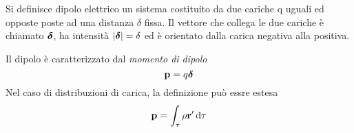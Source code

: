 \begin{defn}
    Si definisce dipolo elettrico un sistema costituito da due cariche q uguali ed opposte poste
    ad una distanza $\delta$ fissa. Il vettore che collega le due cariche è chiamato $\vb*{\delta}$,
    ha intensità $\abs{\vb*{\delta}}=\delta$ ed è orientato dalla carica negativa alla positiva.
\end{defn}

Il dipolo è caratterizzato dal \textit{momento di dipolo}
\begin{equation}
    \label{eqn:momento_di_dipolo}
    \vb{p}=q\vb*{\delta}
\end{equation}
Nel caso di distribuzioni di carica, la definizione può essre estesa
\begin{equation}
    \label{defn:p_rho}
    \vb{p}=\int_\tau \rho\vb{r'} \dd{\tau}
\end{equation}


